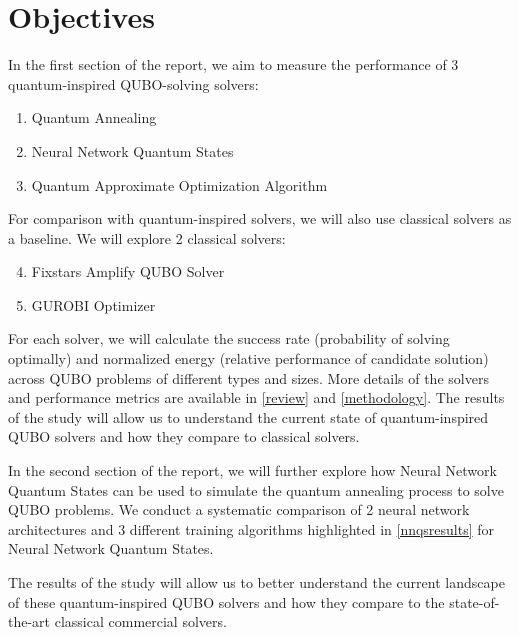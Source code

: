 \section{Objectives}
In the first section of the report, we aim to measure the performance of 3 quantum-inspired QUBO-solving solvers:
\begin{enumerate}
    \item Quantum Annealing
    \item Neural Network Quantum States
    \item Quantum Approximate Optimization Algorithm
\end{enumerate}
For comparison with quantum-inspired solvers, we will also use classical solvers as a baseline. We will explore 2 classical solvers:
\begin{enumerate}
    \setcounter{enumi}{3}
    \item Fixstars Amplify QUBO Solver
    \item GUROBI Optimizer
\end{enumerate}



For each solver, we will calculate the success rate (probability of solving optimally) and normalized energy (relative performance of candidate solution) across QUBO problems of different types and sizes. More details of the solvers and performance metrics are available in \autoref{review} and \autoref{methodology}. The results of the study will allow us to understand the current state of quantum-inspired QUBO solvers and how they compare to classical solvers. 

In the second section of the report, we will further explore how Neural Network Quantum States can be used to simulate the quantum annealing process to solve QUBO problems. We conduct a systematic comparison of 2 neural network architectures and 3 different training algorithms highlighted in \autoref{nnqsresults} for Neural Network Quantum States.

The results of the study will allow us to better understand the current landscape of these quantum-inspired QUBO solvers and how they compare to the state-of-the-art classical commercial solvers.